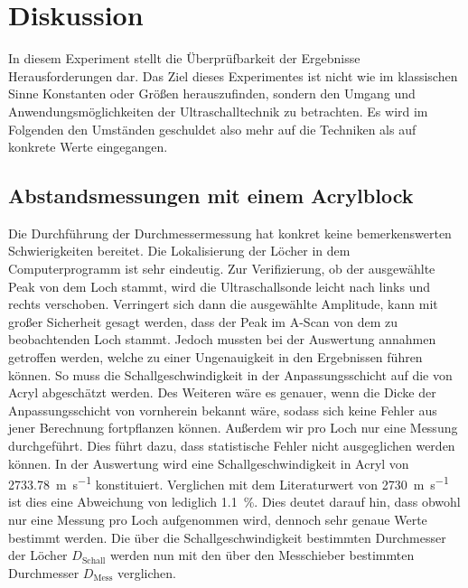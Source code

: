 %

%
\section{Diskussion}
\label{sec:Diskussion}

In diesem Experiment stellt die Überprüfbarkeit der Ergebnisse Herausforderungen dar. 
Das Ziel dieses Experimentes ist nicht wie im klassischen Sinne Konstanten oder Größen 
herauszufinden, sondern den Umgang und Anwendungsmöglichkeiten der Ultraschalltechnik 
zu betrachten. Es wird im Folgenden den Umständen geschuldet also mehr auf die 
Techniken als auf konkrete Werte eingegangen. 

\subsection{Abstandsmessungen mit einem Acrylblock}
Die Durchführung der Durchmessermessung hat konkret keine bemerkenswerten Schwierigkeiten 
bereitet. Die Lokalisierung der Löcher in dem Computerprogramm ist sehr eindeutig. Zur 
Verifizierung, ob der ausgewählte Peak von dem Loch stammt, wird die Ultraschallsonde 
leicht nach links und rechts verschoben. Verringert sich dann die  ausgewählte Amplitude, 
kann mit großer Sicherheit gesagt werden, dass der Peak im A-Scan von dem zu beobachtenden 
Loch stammt. Jedoch mussten bei der Auswertung annahmen getroffen werden, welche zu einer 
Ungenauigkeit in den Ergebnissen führen können. So muss die Schallgeschwindigkeit in der 
Anpassungsschicht auf die von Acryl abgeschätzt werden. Des Weiteren wäre es genauer, wenn 
die Dicke der Anpassungsschicht von vornherein bekannt wäre, sodass sich keine Fehler aus 
jener Berechnung fortpflanzen können. Außerdem wir pro Loch nur eine Messung durchgeführt. 
Dies führt dazu, dass statistische Fehler nicht ausgeglichen werden können. In der Auswertung 
wird eine Schallgeschwindigkeit in Acryl von \qty{2733,78}{\meter \per \second} konstituiert. 
Verglichen mit dem Literaturwert von \qty{2730}{\meter\per\second} ist dies eine Abweichung 
von lediglich \qty{1,1}{\percent}. Dies deutet darauf hin, dass obwohl nur eine Messung pro 
Loch aufgenommen wird, dennoch sehr genaue Werte bestimmt werden. Die über die 
Schallgeschwindigkeit bestimmten Durchmesser der Löcher $D_\text{Schall}$ werden nun mit den 
über den Messchieber bestimmten Durchmesser $D_\text{Mess}$ verglichen.

